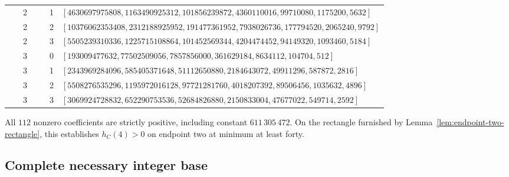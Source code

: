 \begin{center}
\begin{tabular}{rrp{0.86\linewidth}}
2 & 1 & $[4630697975808,\allowbreak 1163490925312,\allowbreak 101856239872,\allowbreak 4360110016,\allowbreak 99710080,\allowbreak 1175200,\allowbreak 5632]$ \\
2 & 2 & $[10376062353408,\allowbreak 2312188925952,\allowbreak 191477361952,\allowbreak 7938026736,\allowbreak 177794520,\allowbreak 2065240,\allowbreak 9792]$ \\
2 & 3 & $[5505239310336,\allowbreak 1225715108864,\allowbreak 101452569344,\allowbreak 4204474452,\allowbreak 94149320,\allowbreak 1093460,\allowbreak 5184]$ \\
3 & 0 & $[193009477632,\allowbreak 77502509056,\allowbreak 7857856000,\allowbreak 361629184,\allowbreak 8634112,\allowbreak 104704,\allowbreak 512]$ \\
3 & 1 & $[2343969284096,\allowbreak 585405371648,\allowbreak 51112650880,\allowbreak 2184643072,\allowbreak 49911296,\allowbreak 587872,\allowbreak 2816]$ \\
3 & 2 & $[5508276535296,\allowbreak 1195972016128,\allowbreak 97721281760,\allowbreak 4018207392,\allowbreak 89506456,\allowbreak 1035632,\allowbreak 4896]$ \\
3 & 3 & $[3069924728832,\allowbreak 652290753536,\allowbreak 52684826880,\allowbreak 2150833004,\allowbreak 47677022,\allowbreak 549714,\allowbreak 2592]$ \\
\bottomrule
\end{tabular}
\end{center}
All $112$ nonzero coefficients are strictly positive, including constant
$611\,305\,472$. On the rectangle furnished by
Lemma~\ref{lem:endpoint-two-rectangle}, this establishes $h_C(4)>0$
on endpoint two at minimum at least forty.

\clearpage
\subsection{Complete necessary integer base}

